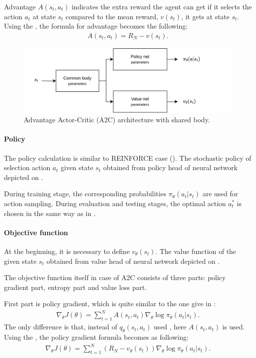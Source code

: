 \documentclass{article}
\begin{document}
Advantage $A(s_t, a_t)$ indicates the extra reward the agent can get if it
selects the action $a_t$ at state $s_t$ compared to the mean reward, $v(s_t)$,
it gets at state $s_t$. Using the , the formula for
advantage becomes the following:
\begin{align}
  \label{eq:a2c_advantage}
  A(s_t, a_t) = R_N - v(s_t).
\end{align}

\begin{figure}[hbt]
  \centering
  \includegraphics[width=\textwidth,keepaspectratio]{pictures/a2c.jpg}
  \caption[Advantage Actor-Critic (A2C) architecture with shared body]
  {Advantage Actor-Critic (A2C) architecture with shared body.
  }\label{fig:a2c_arch}
\end{figure}

\paragraph{Policy}
The policy calculation is similar to REINFORCE case (). The
stochastic policy of selection action $a_t$ given state $s_t$ obtained from
policy head of neural network depicted on .

During training stage, the corresponding probabilities $\pi_{\theta}(a_t | s_t)$
are used for action sampling. During evaluation and
testing stages, the optimal action $a_t^\ast$ is chosen in the same way as in
.

\paragraph{Objective function}
At the beginning, it is necessary to define $v_\theta(s_t)$. The value function
of the given state $s_t$ obtained from value head of neural network depicted on .

The objective function itself in case of A2C consists of three parts: policy
gradient part, entropy part and value loss part.

First part is policy gradient, which is quite similar to the one give in
:
\begin{align*}
  \nabla_{\theta} J(\theta) =
  \sum_{t=1}^N A(s_t, a_t)\nabla_{\theta}  \log \pi_{\theta}(a_t | s_t).
\end{align*}
The only difference is that, instead of $q_\theta(s_t, a_t)$ used
,
here $A(s_t, a_t)$ is used. Using the ,
the policy gradient formula becomes as following:
\begin{align}
  \label{eq:a2c_pg}
  \nabla_{\theta} J(\theta) =
  \sum_{t=1}^N (R_N - v_\theta(s_t)) \nabla_{\theta} \log \pi_{\theta}(a_t | s_t).
\end{align}
\end{document}
